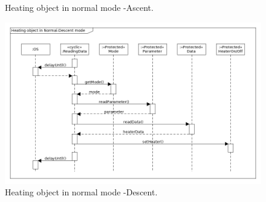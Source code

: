 \documentclass[a4paper,12pt,twoside]{article}
\providecommand{\DIFaddbeginFL}{} %
\providecommand{\DIFaddendFL}{} %
\providecommand{\DIFdelbeginFL}{} %
\providecommand{\DIFdelendFL}{} %
\newcommand{\DIFscaledelfig}{0.5}
\newlength{\DIFdelgraphicswidth} %
\newlength{\DIFdelgraphicsheight} %
\newcommand{\DIFaddincludegraphics}[2][]{{\color{blue}\fbox{\DIFOincludegraphics[#1]{#2}}}} %
\newcommand{\DIFdelincludegraphics}[2][]{%
\sbox{\DIFdelgraphicsbox}{\DIFOincludegraphics[#1]{#2}}%
\settoboxwidth{\DIFdelgraphicswidth}{\DIFdelgraphicsbox} %
\settoboxtotalheight{\DIFdelgraphicsheight}{\DIFdelgraphicsbox} %
\scalebox{\DIFscaledelfig}{%
\parbox[b]{\DIFdelgraphicswidth}{\usebox{\DIFdelgraphicsbox}\\[-\baselineskip] \rule{\DIFdelgraphicswidth}{0em}}\llap{\resizebox{\DIFdelgraphicswidth}{\DIFdelgraphicsheight}{%
\setlength{\unitlength}{\DIFdelgraphicswidth}%
\begin{picture}(1,1)%
\thicklines\linethickness{2pt} %
{\color[rgb]{1,0,0}\put(0,0){\framebox(1,1){}}}%
{\color[rgb]{1,0,0}\put(0,0){\line( 1,1){1}}}%
{\color[rgb]{1,0,0}\put(0,1){\line(1,-1){1}}}%
\end{picture}%
}\hspace*{3pt}}} %
} %
\DeclareRobustCommand{\DIFaddbeginFL}{\DIFOaddbeginFL \let\includegraphics\DIFaddincludegraphics} %
\DeclareRobustCommand{\DIFaddendFL}{\DIFOaddendFL \let\includegraphics\DIFOincludegraphics} %
\DeclareRobustCommand{\DIFdelbeginFL}{\DIFOdelbeginFL \let\includegraphics\DIFdelincludegraphics} %
\DeclareRobustCommand{\DIFdelendFL}{\DIFOaddendFL \let\includegraphics\DIFOincludegraphics} %
\begin{document}
\begin{landscape}
\begin{figure}[H]
    \DIFaddendFL \caption{Heating object in normal mode -Ascent.}
    \label{heaterb}
\end{figure}
\begin{figure}[H]
    \centering
    \DIFdelbeginFL %
\DIFdelendFL \DIFaddbeginFL \includegraphics[height=0.9\textwidth]{appendix/img/heater-seq-dia-c.png}
    \DIFaddendFL \caption{Heating object in normal mode -Descent.}
    \label{heaterc}
\end{figure}

\end{landscape}
\end{document}
